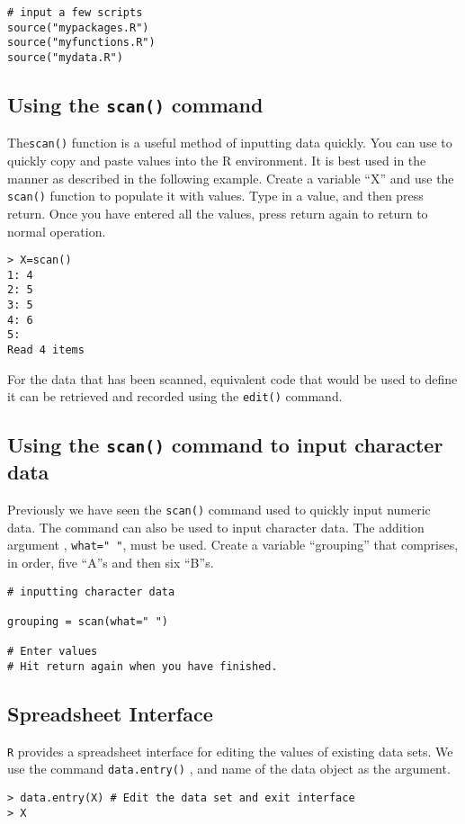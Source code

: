 \documentclass[a4paper,12pt]{article}
\begin{document}
\begin{verbatim}
# input a few scripts
source("mypackages.R")
source("myfunctions.R")
source("mydata.R")
\end{verbatim}

\subsection{ Using the \texttt{scan()} command}
The\texttt{scan()}  function is a useful method of inputting data quickly. You can use to quickly copy and paste values into the R environment.
It is best used in the manner as described in the following example.  Create a variable “X” and use the \texttt{scan()}  function to populate it with values.
Type in a value, and then press return.
Once you have entered all the values, press return again to return to normal operation.
\begin{verbatim}
> X=scan()
1: 4
2: 5
3: 5
4: 6
5: 
Read 4 items
\end{verbatim}
For the data that has been scanned,  equivalent code that would be used to define it can be retrieved and recorded using the \texttt{edit()} command. 
\subsection{Using the \texttt{scan()} command to input character data}
Previously we have seen the \texttt{scan()} command used to quickly input numeric data. The command can also be used to input character data. The addition argument , \texttt{what=" "}, must be used.  
Create a variable “grouping” that comprises, in order,  five “A”s and then six “B”s.

\begin{verbatim}
# inputting character data

grouping = scan(what=" ")

# Enter values
# Hit return again when you have finished.

\end{verbatim}


\subsection{Spreadsheet Interface}
\texttt{R} provides a spreadsheet interface for editing the values of existing data sets.
We use the command \texttt{data.entry()} , and name of the data object as the argument.

\begin{verbatim}
> data.entry(X) # Edit the data set and exit interface
> X
\end{verbatim}
\end{document}
